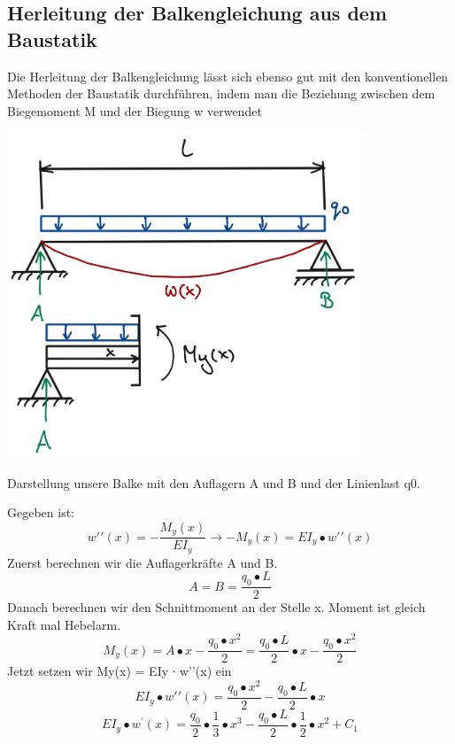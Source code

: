 \subsection{Herleitung der Balkengleichung aus dem Baustatik}
Die Herleitung der Balkengleichung lässt sich ebenso gut mit den konventionellen Methoden der Baustatik durchführen, indem man die Beziehung zwischen dem Biegemoment M und der Biegung w verwendet
\begin{center}
	\includegraphics[width=0.8\textwidth]{papers/balken/images/teil2/HerleitungBaustatik.jpg}
\end{center}
\caption{Darstellung unsere Balke mit den Auflagern A und B und der Linienlast q0.}
Gegeben ist:
\begin{equation}
	w\prime\prime(x)=
	-\frac{M_y(x)}{EI_y}
	\rightarrow-M_y(x)=
	EI_y\bullet w\prime\prime(x)
\end{equation}
Zuerst berechnen wir die Auflagerkräfte A und B.
\begin{equation}
	A=
	B=
	\frac{q_0\bullet L}{2}
\end{equation}
Danach berechnen wir den Schnittmoment an der Stelle x.
Moment ist gleich Kraft mal Hebelarm.
\begin{equation}
	M_y(x)=
	A\bullet x-\frac{q_0\bullet x^2}{2}=
	\frac{q_0\bullet L}{2}\bullet x-\frac{q_0\bullet x^2}{2}
\end{equation}
Jetzt setzen wir My(x) = EIy ∙ w’’(x) ein
\begin{equation}
	EI_y\bullet w\prime\prime(x)=
	\frac{q_0\bullet x^2}{2}-\frac{q_0\bullet L}{2}\bullet x
\end{equation}
\begin{equation}
	EI_y\bullet w^\prime\left(x\right)=
	\frac{q_0}{2}\bullet\frac{1}{3}\bullet x^3-\frac{q_0\bullet L}{2}\bullet\frac{1}{2}\bullet x^2+C_1
\end{equation}
